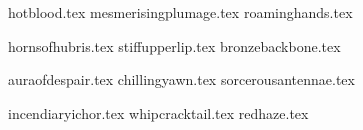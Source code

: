 \begin{multicols}{2}
\endsortedpricelisthtgt

\subtitle{\manifestationsoflust}
\startsortedpricelisthtgt

{hotblood.tex}
{mesmerisingplumage.tex}
{roaminghands.tex}

\endsortedpricelisthtgt

\subtitle{\manifestationsofpride}
\startsortedpricelisthtgt

{hornsofhubris.tex}
{stiffupperlip.tex}
{bronzebackbone.tex}

\endsortedpricelisthtgt

\subtitle{\manifestationsofsloth}
\startsortedpricelisthtgt

{auraofdespair.tex}
{chillingyawn.tex}
{sorcerousantennae.tex}

\endsortedpricelisthtgt

\subtitle{\manifestationsofwrath}
\startsortedpricelisthtgt

{incendiaryichor.tex}
{whipcracktail.tex}
{redhaze.tex}

\endsortedpricelisthtgt
\end{multicols}

